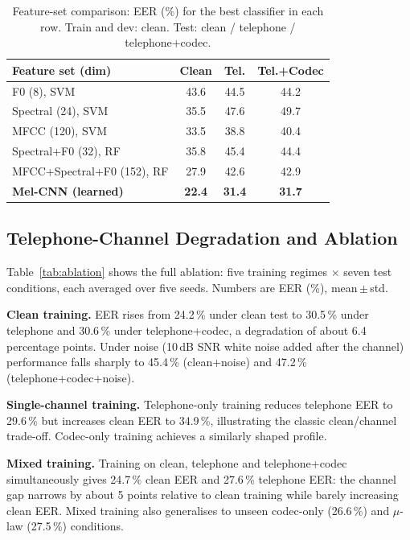 \documentclass[conference]{IEEEtran}
\begin{document}
\begin{table}[htbp]
\caption{Feature-set comparison: EER (\%) for the best classifier in each row. Train and dev: clean. Test: clean / telephone / telephone+codec.}
\begin{center}
\begin{tabular}{lccc}
\toprule
\textbf{Feature set (dim)} & \textbf{Clean} & \textbf{Tel.} & \textbf{Tel.+Codec}\\
\midrule
F0 (8), SVM                     & 43.6 & 44.5 & 44.2\\
Spectral (24), SVM              & 35.5 & 47.6 & 49.7\\
MFCC (120), SVM                 & 33.5 & 38.8 & 40.4\\
Spectral+F0 (32), RF            & 35.8 & 45.4 & 44.4\\
MFCC+Spectral+F0 (152), RF      & 27.9 & 42.6 & 42.9\\
\textbf{Mel-CNN (learned)}       & \textbf{22.4} & \textbf{31.4} & \textbf{31.7}\\
\bottomrule
\end{tabular}
\label{tab:features}
\end{center}
\end{table}

\subsection{Telephone-Channel Degradation and Ablation}

Table~\ref{tab:ablation} shows the full ablation: five training regimes $\times$ seven test conditions, each averaged over five seeds. Numbers are EER (\%), mean\,$\pm$\,std.

\textbf{Clean training.} EER rises from 24.2\,\% under clean test to 30.5\,\% under telephone and 30.6\,\% under telephone+codec, a degradation of about 6.4 percentage points. Under noise (10\,dB SNR white noise added after the channel) performance falls sharply to 45.4\,\% (clean+noise) and 47.2\,\% (telephone+codec+noise).

\textbf{Single-channel training.} Telephone-only training reduces telephone EER to 29.6\,\% but increases clean EER to 34.9\,\%, illustrating the classic clean/channel trade-off. Codec-only training achieves a similarly shaped profile.

\textbf{Mixed training.} Training on clean, telephone and telephone+codec simultaneously gives 24.7\,\% clean EER and 27.6\,\% telephone EER: the channel gap narrows by about 5 points relative to clean training while barely increasing clean EER. Mixed training also generalises to unseen codec-only (26.6\,\%) and $\mu$-law (27.5\,\%) conditions.
\end{document}
